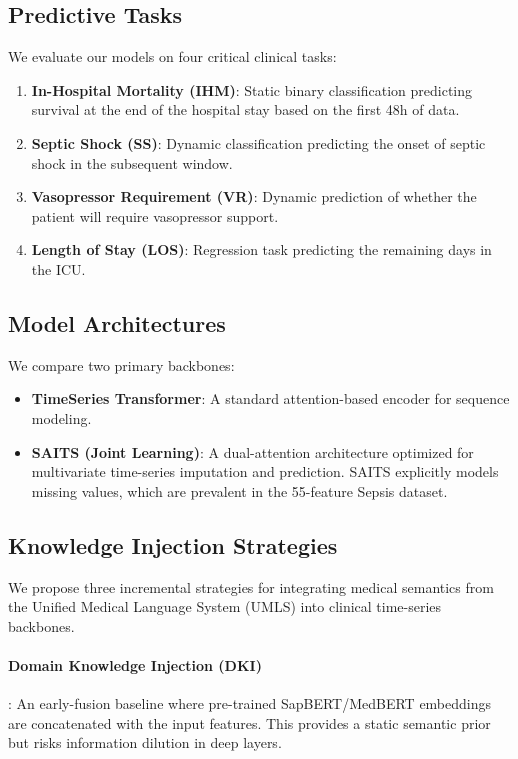 \subsection{Predictive Tasks}
\label{subsec:tasks}
We evaluate our models on four critical clinical tasks:
\begin{enumerate}
    \item \textbf{In-Hospital Mortality (IHM)}: Static binary classification predicting survival at the end of the hospital stay based on the first 48h of data.
    \item \textbf{Septic Shock (SS)}: Dynamic classification predicting the onset of septic shock in the subsequent window.
    \item \textbf{Vasopressor Requirement (VR)}: Dynamic prediction of whether the patient will require vasopressor support.
    \item \textbf{Length of Stay (LOS)}: Regression task predicting the remaining days in the ICU.
\end{enumerate}

\subsection{Model Architectures}
\label{subsec:architectures}
We compare two primary backbones:
\begin{itemize}
    \item \textbf{TimeSeries Transformer}: A standard attention-based encoder for sequence modeling.
    \item \textbf{SAITS (Joint Learning)}: A dual-attention architecture optimized for multivariate time-series imputation and prediction. SAITS explicitly models missing values, which are prevalent in the 55-feature Sepsis dataset.
\end{itemize}

\subsection{Knowledge Injection Strategies}
\label{subsec:kgi}
We propose three incremental strategies for integrating medical semantics from the Unified Medical Language System (UMLS) into clinical time-series backbones.

\paragraph{Domain Knowledge Injection (DKI)}: An early-fusion baseline where pre-trained SapBERT/MedBERT embeddings are concatenated with the input features. This provides a static semantic prior but risks information dilution in deep layers.

